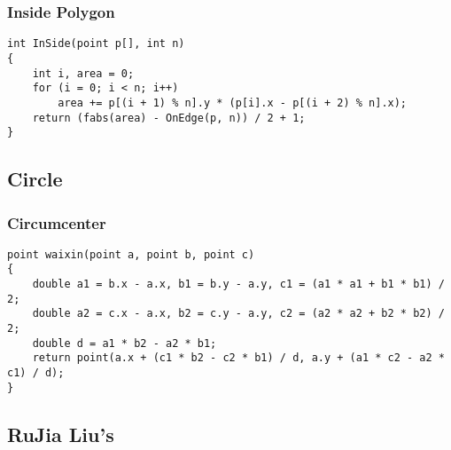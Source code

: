\documentclass[twoside]{article}
\begin{document}
\subsubsection{Inside Polygon}
\begin{lstlisting}
int InSide(point p[], int n)
{
    int i, area = 0;
    for (i = 0; i < n; i++)
        area += p[(i + 1) % n].y * (p[i].x - p[(i + 2) % n].x);
    return (fabs(area) - OnEdge(p, n)) / 2 + 1;
}
\end{lstlisting}
\subsection{Circle}
\subsubsection{Circumcenter}
\begin{lstlisting}
point waixin(point a, point b, point c)
{
    double a1 = b.x - a.x, b1 = b.y - a.y, c1 = (a1 * a1 + b1 * b1) / 2;
    double a2 = c.x - a.x, b2 = c.y - a.y, c2 = (a2 * a2 + b2 * b2) / 2;
    double d = a1 * b2 - a2 * b1;
    return point(a.x + (c1 * b2 - c2 * b1) / d, a.y + (a1 * c2 - a2 * c1) / d);
}
\end{lstlisting}
\subsection{RuJia Liu's}
\end{document}
